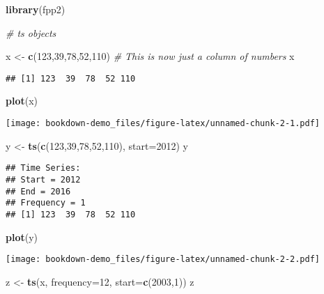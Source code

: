 \documentclass[]{book}
\newenvironment{Shaded}{\begin{snugshade}}{\end{snugshade}}
\newcommand{\CommentTok}[1]{\textcolor[rgb]{0.56,0.35,0.01}{\textit{#1}}}
\newcommand{\DataTypeTok}[1]{\textcolor[rgb]{0.13,0.29,0.53}{#1}}
\newcommand{\DecValTok}[1]{\textcolor[rgb]{0.00,0.00,0.81}{#1}}
\newcommand{\KeywordTok}[1]{\textcolor[rgb]{0.13,0.29,0.53}{\textbf{#1}}}
\newcommand{\NormalTok}[1]{#1}
\newcommand{\StringTok}[1]{\textcolor[rgb]{0.31,0.60,0.02}{#1}}
\begin{document}
\begin{Shaded}
\begin{Highlighting}[]
\KeywordTok{library}\NormalTok{(fpp2)}

\CommentTok{# ts objects}
  
\NormalTok{x <-}\StringTok{ }\KeywordTok{c}\NormalTok{(}\DecValTok{123}\NormalTok{,}\DecValTok{39}\NormalTok{,}\DecValTok{78}\NormalTok{,}\DecValTok{52}\NormalTok{,}\DecValTok{110}\NormalTok{) }\CommentTok{# This is now just a column of numbers}
\NormalTok{x}
\end{Highlighting}
\end{Shaded}

\begin{verbatim}
## [1] 123  39  78  52 110
\end{verbatim}

\begin{Shaded}
\begin{Highlighting}[]
\KeywordTok{plot}\NormalTok{(x)}
\end{Highlighting}
\end{Shaded}

\texttt{[image: bookdown-demo\_files/figure-latex/unnamed-chunk-2-1.pdf]}

\begin{Shaded}
\begin{Highlighting}[]
\NormalTok{  y <-}\StringTok{ }\KeywordTok{ts}\NormalTok{(}\KeywordTok{c}\NormalTok{(}\DecValTok{123}\NormalTok{,}\DecValTok{39}\NormalTok{,}\DecValTok{78}\NormalTok{,}\DecValTok{52}\NormalTok{,}\DecValTok{110}\NormalTok{), }\DataTypeTok{start=}\DecValTok{2012}\NormalTok{)}
\NormalTok{  y}
\end{Highlighting}
\end{Shaded}

\begin{verbatim}
## Time Series:
## Start = 2012 
## End = 2016 
## Frequency = 1 
## [1] 123  39  78  52 110
\end{verbatim}

\begin{Shaded}
\begin{Highlighting}[]
\KeywordTok{plot}\NormalTok{(y)}
\end{Highlighting}
\end{Shaded}

\texttt{[image: bookdown-demo\_files/figure-latex/unnamed-chunk-2-2.pdf]}

\begin{Shaded}
\begin{Highlighting}[]
\NormalTok{  z <-}\StringTok{ }\KeywordTok{ts}\NormalTok{(x, }\DataTypeTok{frequency=}\DecValTok{12}\NormalTok{, }\DataTypeTok{start=}\KeywordTok{c}\NormalTok{(}\DecValTok{2003}\NormalTok{,}\DecValTok{1}\NormalTok{))}
\NormalTok{  z}
\end{Highlighting}
\end{Shaded}
\end{document}
